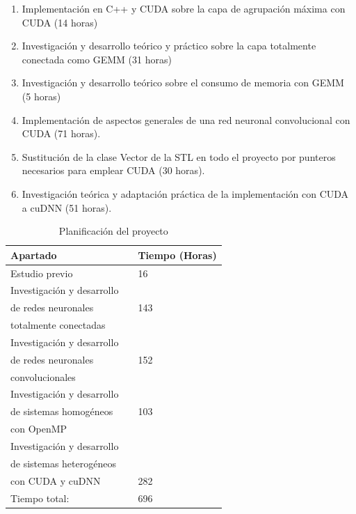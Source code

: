 \begin{enumerate}[label=\textbullet]
\begin{enumerate}[label=\textbullet]
		\item Implementación en C++ y CUDA sobre la capa de agrupación máxima con CUDA (14 horas)
		\item Investigación y desarrollo teórico y práctico sobre la capa totalmente conectada como GEMM (31 horas)
		\item Investigación y desarrollo teórico sobre el consumo de memoria con GEMM (5 horas)
		\item Implementación de aspectos generales de una red neuronal convolucional con CUDA (71 horas).
		\item Sustitución de la clase Vector de la STL en todo el proyecto por punteros necesarios para emplear CUDA (30 horas).
		\item Investigación teórica y adaptación práctica de la implementación con CUDA a cuDNN (51 horas).
	\end{enumerate}
	
\end{enumerate}


\begin{table}[H]
	\centering
	\begin{tabular}{|lll|}
		\hline
		Apartado 	 &\vline  & Tiempo (Horas) \\
		\hline
		
		Estudio previo    & \vline & 16 \\			
		\hline
		Investigación y desarrollo  	 & \vline & 	\\
		de redes neuronales  	 & \vline & 143	\\
		totalmente conectadas 	 & \vline & 	\\
		\hline
		Investigación y desarrollo    & \vline & 	 \\	
		de redes neuronales    & \vline & 152	 \\			
		convolucionales    & \vline & 	 \\					
		\hline
		Investigación y desarrollo  	 & \vline & 	 \\
		de sistemas homogéneos  	 & \vline & 103	 \\
		con OpenMP 	 & \vline & 	 \\
		\hline
		Investigación y desarrollo     & \vline &  	\\
		de sistemas heterogéneos    & \vline &  \\ 
		con CUDA y cuDNN    & \vline & 282 \\ 	
		\hline
		\hline
		Tiempo total:				& \vline & 696 \\
		\hline
	\end{tabular}
	\caption{Planificación del proyecto}
	\label{tabla_planificación}
\end{table}

